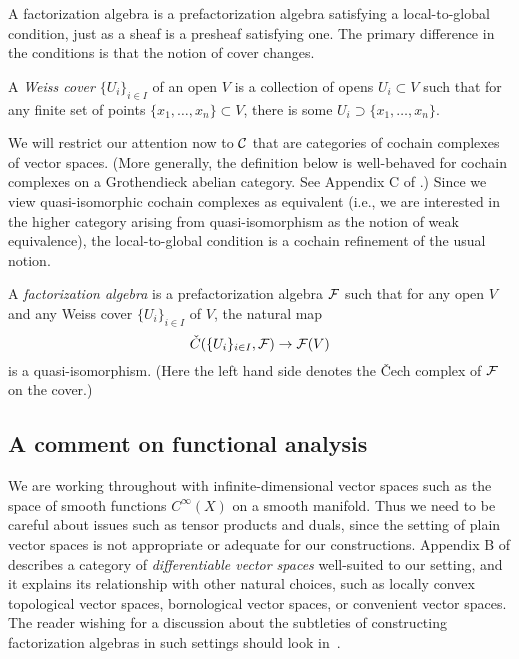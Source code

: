 A factorization algebra is a prefactorization algebra satisfying a local-to-global condition,
just as a sheaf is a presheaf satisfying one.
The primary difference in the conditions is that the notion of cover changes.

\begin{dfn}
A \emph{Weiss cover} $\{U_i\}_{i \in I}$ of an open $V$ is a collection 
of opens $U_i \subset V$ such that for any finite set of points $\{x_1,\ldots,x_n\} \subset V$,
there is some $U_i \supset \{x_1,\ldots,x_n\}$.
\end{dfn}

We will restrict our attention now to $\mathcal C$ that are categories of cochain complexes of vector spaces.
(More generally, the definition below is well-behaved for cochain complexes on a Grothendieck abelian category.
See Appendix C of \cite{CG}.)
Since we view quasi-isomorphic cochain complexes as equivalent 
(i.e., we are interested in the higher category arising from quasi-isomorphism as the notion of weak equivalence),
the local-to-global condition is a cochain refinement of the usual notion.

\begin{dfn}
A \emph{factorization algebra} is a prefactorization algebra $\mathcal F$ such that
for any open $V$ and any Weiss cover $\{U_i\}_{i \in I}$ of $V$,
the natural map
\[
\check{C}(\{U_i\}_{i \in I},\mathcal F) \to \mathcal F(V)
\]
is a quasi-isomorphism.
(Here the left hand side denotes the \v{C}ech complex of $\mathcal F$ on the cover.)
\end{dfn}

\subsection{A comment on functional analysis}
\label{sec functional analysis}

We are working throughout with infinite-dimensional vector spaces 
such as the space of smooth functions $C^\infty(X)$ on a smooth manifold.
Thus we need to be careful about issues such as tensor products and duals,
since the setting of plain vector spaces is not appropriate or adequate for our constructions.
Appendix B of \cite{CG} describes a category of {\em differentiable vector spaces} well-suited to our setting, 
and it explains its relationship with other natural choices, 
such as locally convex topological vector spaces, bornological vector spaces, or convenient vector spaces.
The reader wishing for a discussion about the subtleties of constructing factorization algebras in such settings should look in~\cite{CG}.

